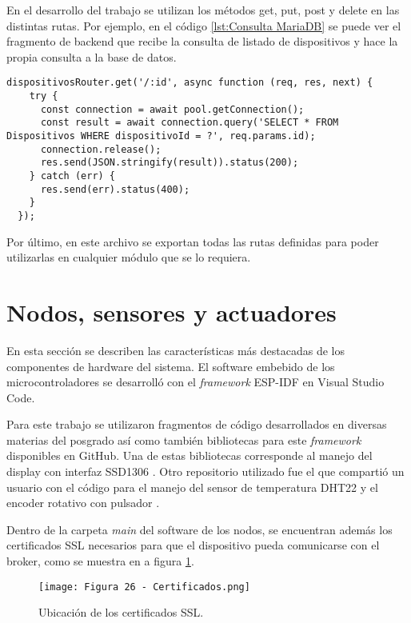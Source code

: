 En el desarrollo del trabajo se utilizan los métodos get, put, post y delete en las distintas rutas. Por ejemplo, en el código \ref{lst:Consulta MariaDB} se puede ver el fragmento de backend que recibe la consulta de listado de dispositivos y hace la propia consulta a la base de datos.

\begin{lstlisting}[caption={Consulta de listado de dispositivos al backend.}, label={lst:Consulta MariaDB}]
dispositivosRouter.get('/:id', async function (req, res, next) {
    try {
      const connection = await pool.getConnection();
      const result = await connection.query('SELECT * FROM Dispositivos WHERE dispositivoId = ?', req.params.id);
      connection.release();
      res.send(JSON.stringify(result)).status(200);
    } catch (err) {
      res.send(err).status(400);
    }
  });
\end{lstlisting}

Por último, en este archivo se exportan todas las rutas definidas para poder utilizarlas en cualquier módulo que se lo requiera.

\section{Nodos, sensores y actuadores}

En esta sección se describen las características más destacadas de los componentes de hardware del sistema. El software embebido de los microcontroladores se desarrolló con el \textit{framework} ESP-IDF \citep{36} en Visual Studio Code.

Para este trabajo se utilizaron fragmentos de código desarrollados en diversas materias del posgrado así como también bibliotecas para este \textit{framework} disponibles en GitHub. Una de estas bibliotecas corresponde al manejo del display con interfaz SSD1306 \citep{37}. Otro repositorio utilizado fue el que compartió un usuario con el código para el manejo del sensor de temperatura DHT22 y el encoder rotativo con pulsador \citep{38}.

Dentro de la carpeta \textit{main} del software de los nodos, se encuentran además los certificados SSL necesarios para que el dispositivo pueda comunicarse con el broker, como se muestra en a figura \ref{fig:26}.

\begin{figure}[h]
\centering
\texttt{[image: Figura 26 - Certificados.png]}
\caption[Certificados]{Ubicación de los certificados SSL.}
\label{fig:26}
\end{figure}


